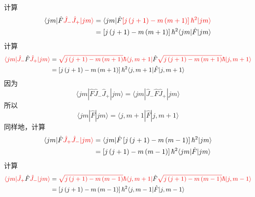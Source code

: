 计算
\begin{equation}
    \begin{aligned}
        \langle jm|\hat{F}{\color[RGB]{240, 0, 0} \hat{J}_-\hat{J}_+|jm\rangle }&=\langle jm|\hat{F}{\color[RGB]{240, 0, 0} \left[ j\left( j+1 \right) -m\left( m+1 \right) \right] \hbar ^2|jm\rangle }
\\
&=\left[ j\left( j+1 \right) -m\left( m+1 \right) \right] \hbar ^2\langle jm|\hat{F}|jm\rangle 
    \end{aligned}
\end{equation}
计算
\begin{equation}
    \begin{aligned}
        {\color[RGB]{240, 0, 0} \langle jm|\hat{J}_-}\hat{F}{\color[RGB]{240, 0, 0} \hat{J}_+|jm\rangle }&={\color[RGB]{240, 0, 0} \sqrt{j\left( j+1 \right) -m\left( m+1 \right)}\hbar \langle j,m+1|}\hat{F}{\color[RGB]{240, 0, 0} \sqrt{j\left( j+1 \right) -m\left( m+1 \right)}\hbar |j,m+1\rangle }
\\
&=\left[ j\left( j+1 \right) -m\left( m+1 \right) \right] \hbar ^2\langle j,m+1|\hat{F}|j,m+1\rangle 
    \end{aligned}
\end{equation}
因为
\begin{equation}
    \langle jm|\hat{F}\hat{J}_-\hat{J}_+|jm\rangle =\langle jm|\hat{J}_-\hat{F}\hat{J}_+|jm\rangle 
\end{equation}
所以
\begin{equation}
    \langle jm|\hat{F}|jm\rangle =\langle j,m+1|\hat{F}|j,m+1\rangle 
\end{equation}
同样地，计算
\begin{equation}
    \begin{aligned}
        \langle jm|\hat{F}{\color[RGB]{240, 0, 0} \hat{J}_+\hat{J}_-|jm\rangle }&=\langle jm|\hat{F}\left[ j\left( j+1 \right) -m\left( m-1 \right) \right] \hbar ^2|jm\rangle 
\\
&=\left[ j\left( j+1 \right) -m\left( m-1 \right) \right] \hbar ^2\langle jm|\hat{F}|jm\rangle 
    \end{aligned}
\end{equation}
计算
\begin{equation}
    \begin{aligned}
        {\color[RGB]{240, 0, 0} \langle jm|\hat{J}_+}\hat{F}{\color[RGB]{240, 0, 0} \hat{J}_-|jm\rangle }&={\color[RGB]{240, 0, 0} \sqrt{j\left( j+1 \right) -m\left( m-1 \right)}\hbar \langle j,m+1|}\hat{F}{\color[RGB]{240, 0, 0} \sqrt{j\left( j+1 \right) -m\left( m-1 \right)}\hbar |j,m-1\rangle }
\\
&=\left[ j\left( j+1 \right) -m\left( m-1 \right) \right] \hbar ^2\langle j,m-1|\hat{F}|j,m-1\rangle 
    \end{aligned}
\end{equation}

